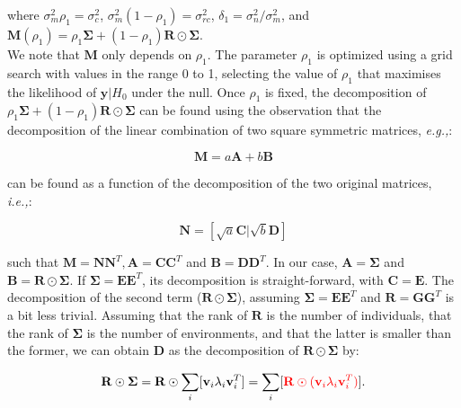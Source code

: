 where $\sigma_m^2\rho_1 = \sigma_c^2$,
$\sigma_m^2(1-\rho_1) = \sigma_{rc}^2$,
$\delta_1 = \sigma_n^2/\sigma_m^2$, and $\mathbf{M}(\rho_1) = \rho_1\boldsymbol{\Sigma} + (1-\rho_1) \mathbf{R} \odot \boldsymbol{\Sigma}$.\\

We note that $\mathbf{M}$ only depends on $\rho_1$. 
The parameter $\rho_1$ is optimized using a grid search with values in the range 0 to 1, selecting the value of $\rho_1$ that maximises the likelihood of $\mathbf{y}|H_0$ under the null.
Once $\rho_1$ is fixed, the decomposition of $\rho_1\boldsymbol{\Sigma} + (1-\rho_1) \mathbf{R} \odot \boldsymbol{\Sigma}$ can be found using the observation that the decomposition of the linear combination of two square symmetric matrices, \textit{e.g.,}:

\begin{equation}
    \mathbf{M} = a\mathbf{A} + b\mathbf{B}
\end{equation}

can be found as a function of the decomposition of the two original matrices, \textit{i.e.,}:

\begin{equation}
    \mathbf{N} = [\sqrt{a}\mathbf{C} | \sqrt{b}\mathbf{D}]
\end{equation}

such that $\mathbf{M}=\mathbf{N}\mathbf{N}^T, \mathbf{A}=\mathbf{C}\mathbf{C}^T$ and $\mathbf{B}=\mathbf{D}\mathbf{D}^T$. 
In our case, $\mathbf{A} = \boldsymbol{\Sigma}$ and $\mathbf{B} = \mathbf{R} \odot \boldsymbol{\Sigma}$.
If $\boldsymbol{\Sigma} = \mathbf{E}\mathbf{E}^T$, its decomposition is straight-forward, with $\mathbf{C} = \mathbf{E}$.
The decomposition of the second term ($ \mathbf{R} \odot \boldsymbol{\Sigma}$), assuming $\boldsymbol{\Sigma} = \mathbf{E}\mathbf{E}^T$ and $\mathbf{R} = \mathbf{G}\mathbf{G}^T$ is a bit less trivial.
Assuming that the rank of $\mathbf{R}$ is the number of individuals, that the rank of $\boldsymbol{\Sigma}$ is the number of environments, and that the latter is smaller than the former, we can obtain $\mathbf{D}$ as the decomposition of $\mathbf{R} \odot \boldsymbol{\Sigma}$ by:

\begin{equation}
    \mathbf{R} \odot \boldsymbol{\Sigma} = \mathbf{R} \odot \sum_i[\mathbf{v}_i \lambda_i \mathbf{v}_i^T] = \sum_i[\textcolor{red}{\mathbf{R} \odot (\mathbf{v}_i \lambda_i \mathbf{v}_i^T)}].
\end{equation}

